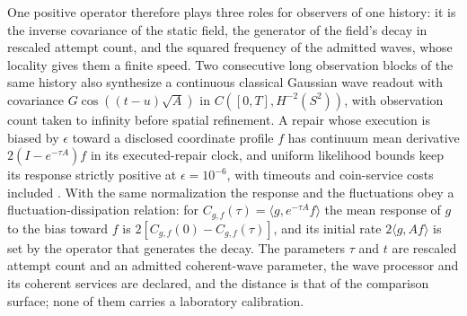 \documentclass[11pt]{article}
\theoremstyle{definition}
\theoremstyle{remark}
\begin{document}
One positive operator therefore plays three roles for observers of one
history: it is the inverse covariance of the static field, the generator of
the field's decay in rescaled attempt count, and the squared frequency of the
admitted waves, whose locality gives them a finite speed. Two consecutive
long observation blocks of the same history also synthesize a continuous
classical Gaussian wave readout with covariance $G\cos((t-u)\sqrt A)$ in
$C([0,T],H^{-2}(S^2))$, with observation count taken to infinity before
spatial refinement. A repair whose execution is biased by $\epsilon$ toward
a disclosed coordinate profile $f$ has continuum mean derivative
$2(I-e^{-\tau A})f$ in its executed-repair clock, and uniform likelihood
bounds keep its response strictly positive at $\epsilon=10^{-6}$, with
timeouts and coin-service costs included \cite{ophpredictions}. With the
same normalization the response and the fluctuations obey a
fluctuation-dissipation relation: for
$C_{g,f}(\tau)=\langle g,e^{-\tau A}f\rangle$ the mean response of $g$ to the
bias toward $f$ is $2[C_{g,f}(0)-C_{g,f}(\tau)]$, and its initial rate
$2\langle g,Af\rangle$ is set by the operator that generates the decay. The
parameters $\tau$ and $t$ are rescaled attempt count and an admitted
coherent-wave parameter, the wave processor and its coherent services are
declared, and the distance is that of the comparison surface; none of them
carries a laboratory calibration.
\end{document}
